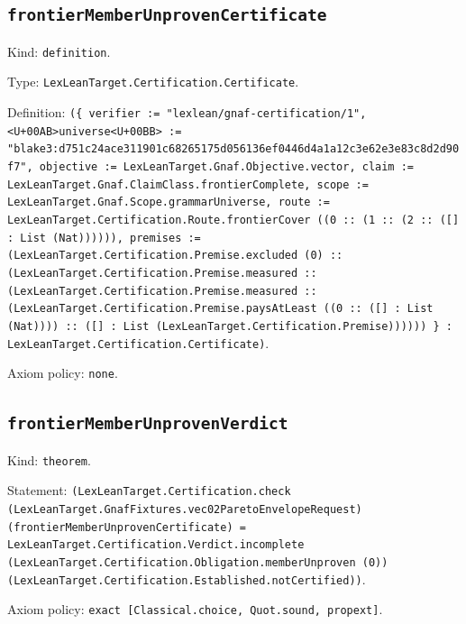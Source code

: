 \documentclass[11pt]{article}
\begin{document}
\subsection*{\texttt{frontierMemberUnprovenCertificate}}
\noindent Kind: \texttt{definition}.\par
\noindent Type: \texttt{LexLeanTarget.Certification.Certificate}.\par
\noindent Definition: \texttt{(\{ verifier := "lexlean/gnaf-certification/1", <U+00AB>universe<U+00BB> := "blake3:d751c24ace311901c68265175d056136ef0446d4a1a12c3e62e3e83c8d2d90f7", objective := LexLeanTarget.Gnaf.Objective.vector, claim := LexLeanTarget.Gnaf.ClaimClass.frontierComplete, scope := LexLeanTarget.Gnaf.Scope.grammarUniverse, route := LexLeanTarget.Certification.Route.frontierCover ((0 :: (1 :: (2 :: ([] : List (Nat)))))), premises := (LexLeanTarget.Certification.Premise.excluded (0) :: (LexLeanTarget.Certification.Premise.measured :: (LexLeanTarget.Certification.Premise.measured :: (LexLeanTarget.Certification.Premise.paysAtLeast ((0 :: ([] : List (Nat)))) :: ([] : List (LexLeanTarget.Certification.Premise)))))) \} : LexLeanTarget.Certification.Certificate)}.\par
\noindent Axiom policy: \texttt{none}.\par
\subsection*{\texttt{frontierMemberUnprovenVerdict}}
\noindent Kind: \texttt{theorem}.\par
\noindent Statement: \texttt{(LexLeanTarget.Certification.check (LexLeanTarget.GnafFixtures.vec02ParetoEnvelopeRequest) (frontierMemberUnprovenCertificate) = LexLeanTarget.Certification.Verdict.incomplete (LexLeanTarget.Certification.Obligation.memberUnproven (0)) (LexLeanTarget.Certification.Established.notCertified))}.\par
\noindent Axiom policy: \texttt{exact [Classical.choice, Quot.sound, propext]}.\par
\end{document}
